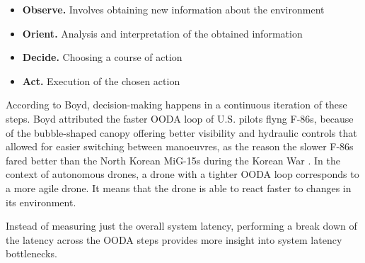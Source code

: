 \begin{itemize}
    \item \textbf{Observe.} Involves obtaining new information about the environment
    \item \textbf{Orient.} Analysis and interpretation of the obtained information
    \item \textbf{Decide.} Choosing a course of action
    \item \textbf{Act.} Execution of the chosen action
\end{itemize}

According to Boyd, decision-making happens in a continuous iteration of these
steps. Boyd attributed the faster OODA loop of U.S. pilots flyng F-86s, because
of the bubble-shaped canopy offering better visibility and hydraulic controls
that allowed for easier switching between manoeuvres, as the reason the slower
F-86s fared better than the North Korean MiG-15s during the Korean War
\cite{morton1995}. In the context of autonomous drones, a drone with a tighter
OODA loop corresponds to a more agile drone. It means that the drone is able
to react faster to changes in its environment.

Instead of measuring just the overall system latency, performing a
break down of the latency across the OODA steps provides more insight into
system latency bottlenecks.

